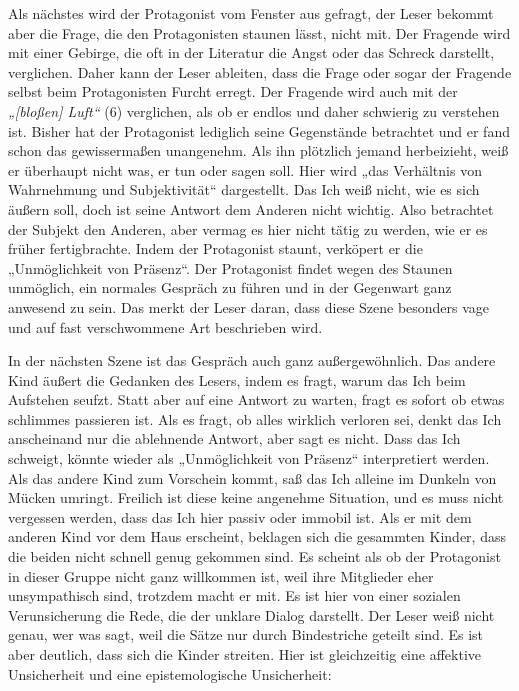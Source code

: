 \documentclass[12pt,a4paper]{article}
\begin{document}
Als nächstes wird der Protagonist vom Fenster aus gefragt, der Leser bekommt aber die Frage, die den Protagonisten staunen lässt, nicht mit. Der Fragende wird mit einer Gebirge, die oft in der Literatur die Angst oder das Schreck darstellt, verglichen. Daher kann der Leser ableiten, dass die Frage oder sogar der Fragende selbst beim Protagonisten Furcht erregt. Der Fragende wird auch mit der \textit{„[bloßen] Luft“} (6) verglichen, als ob er endlos und daher schwierig zu verstehen ist. Bisher hat der Protagonist lediglich seine Gegenstände betrachtet und er fand schon das gewissermaßen unangenehm. Als ihn plötzlich jemand herbeizieht, weiß er überhaupt nicht was, er tun oder sagen soll. Hier wird „das Verhältnis von Wahrnehmung und Subjektivität“\autocite[103f]{fromm} dargestellt. Das Ich weiß nicht, wie es sich äußern soll, doch ist seine Antwort dem Anderen nicht wichtig. Also betrachtet der Subjekt den Anderen, aber vermag es hier nicht tätig zu werden, wie er es früher fertigbrachte. Indem der Protagonist staunt, verköpert er die „Unmöglichkeit von Präsenz“.\autocite[104]{fromm} Der Protagonist findet wegen des Staunen unmöglich, ein normales Gespräch zu führen und in der Gegenwart ganz anwesend zu sein. Das merkt der Leser daran, dass diese Szene besonders vage und auf fast verschwommene Art beschrieben wird.\par
%
In der nächsten Szene ist das Gespräch auch ganz außergewöhnlich. Das andere Kind äußert die Gedanken des Lesers, indem es fragt, warum das Ich beim Aufstehen seufzt. Statt aber auf eine Antwort zu warten, fragt es sofort ob etwas schlimmes passieren ist. Als es fragt, ob alles wirklich verloren sei, denkt das Ich anscheinand nur die ablehnende Antwort, aber sagt es nicht. Dass das Ich schweigt, könnte wieder als „Unmöglichkeit von Präsenz“ interpretiert werden. Als das andere Kind zum Vorschein kommt, saß das Ich alleine im Dunkeln von Mücken umringt. Freilich ist diese keine angenehme Situation, und es muss nicht vergessen werden, dass das Ich hier passiv oder immobil ist. Als er mit dem anderen Kind vor dem Haus erscheint, beklagen sich die gesammten Kinder, dass die beiden nicht schnell genug gekommen sind. Es scheint als ob der Protagonist in dieser Gruppe nicht ganz willkommen ist, weil ihre Mitglieder eher unsympathisch sind, trotzdem macht er mit. Es ist hier von einer sozialen Verunsicherung die Rede, die der unklare Dialog darstellt. Der Leser weiß nicht genau, wer was sagt, weil die Sätze nur durch Bindestriche geteilt sind. Es ist aber deutlich, dass sich die Kinder streiten. Hier ist gleichzeitig eine affektive Unsicherheit und eine epistemologische Unsicherheit:
\end{document}
